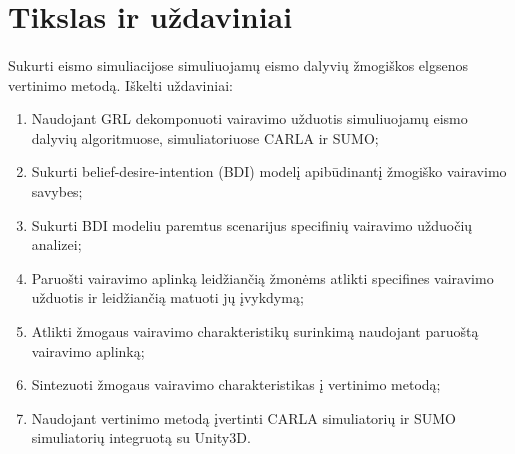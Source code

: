 \documentclass{beamer}
\begin{document}
\section{Tikslas ir uždaviniai}
\begingroup
\small%
\begin{frame}{\insertsection}
	\framesubtitle{\insertsubsection}
	\vspace{-30.5pt}
	
	Sukurti eismo simuliacijose simuliuojamų eismo dalyvių žmogiškos elgsenos vertinimo metodą. Iškelti uždaviniai:
	
	\begin{enumerate}
		\item Naudojant GRL dekomponuoti vairavimo užduotis simuliuojamų eismo dalyvių algoritmuose, simuliatoriuose CARLA ir SUMO;
		\item Sukurti belief-desire-intention (BDI) modelį apibūdinantį žmogiško vairavimo savybes;
		\item Sukurti BDI modeliu paremtus scenarijus specifinių vairavimo užduočių analizei;
		\item Paruošti vairavimo aplinką leidžiančią žmonėms atlikti specifines vairavimo užduotis ir leidžiančią matuoti jų įvykdymą;
		\item Atlikti žmogaus vairavimo charakteristikų surinkimą naudojant paruoštą vairavimo aplinką;
		\item Sintezuoti žmogaus vairavimo charakteristikas į vertinimo metodą;
		\item Naudojant vertinimo metodą įvertinti CARLA simuliatorių ir SUMO simuliatorių integruotą su Unity3D.
	\end{enumerate}
\end{frame}
\endgroup
\end{document}
